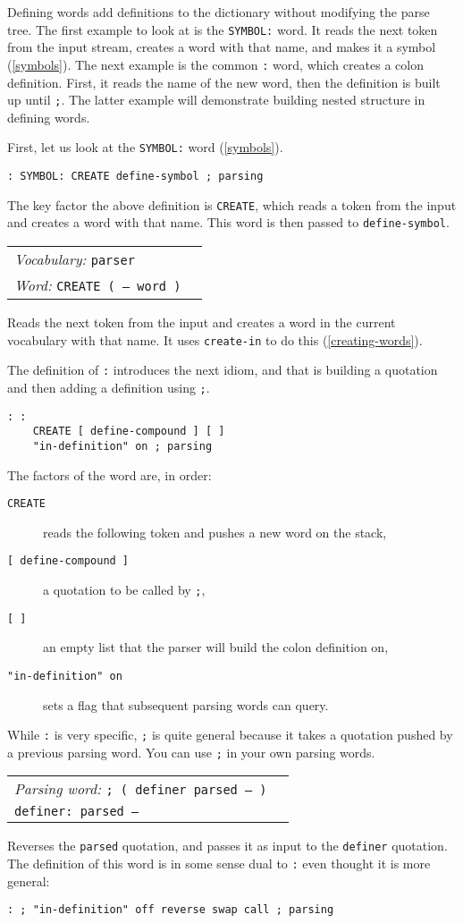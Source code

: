 \documentclass{book}
\newcommand{\vocabulary}[1]{\emph{Vocabulary:} \texttt{#1}&\\}
\newcommand{\parsingword}[2]{\index{\texttt{#1}}\emph{Parsing word:} \texttt{#2}&\\}
\newcommand{\ordinaryword}[2]{\index{\texttt{#1}}\emph{Word:} \texttt{#2}&\\}
\newcommand{\wordtable}[1]{


\begin{tabularx}{12cm}{lX}
\hline
#1
\hline
\end{tabularx}

}
\begin{document}
Defining words add definitions to the dictionary without modifying the parse tree.
The first example to look at is the \verb|SYMBOL:| word. It reads the next token from the input stream, creates a word with that name, and makes it a symbol (\ref{symbols}). The next
example is the common \verb|:| word, which creates a colon definition. First, it reads the
name of the new word, then the definition is built up until \verb|;|. The latter
example will demonstrate building nested structure in defining words.

First, let us look at the \verb|SYMBOL:| word (\ref{symbols}).
\begin{verbatim}
: SYMBOL: CREATE define-symbol ; parsing
\end{verbatim}
The key factor the above definition is \verb|CREATE|, which reads a token from the input and creates a word with that name. This word is then passed to \verb|define-symbol|.

\wordtable{
\vocabulary{parser}
\ordinaryword{CREATE}{CREATE ( -- word )}
}
Reads the next token from the input and creates a word in the current vocabulary with that name. It uses \verb|create-in| to do this (\ref{creating-words}).

The definition of \verb|:| introduces the next idiom, and that is building a quotation and then adding a definition using \verb|;|.
\begin{verbatim}
: :
    CREATE [ define-compound ] [ ]
    "in-definition" on ; parsing
\end{verbatim}
The factors of the word are, in order:
\begin{description}
\item[\texttt{CREATE}] reads the following token and pushes a new word on the stack,
\item[\texttt{[ define-compound ]}] a quotation to be called by \verb|;|,
\item[\texttt{[ ]}] an empty list that the parser will build the colon definition on,
\item[\texttt{"in-definition" on}] sets a flag that subsequent parsing words can query.
\end{description}
While \verb|:| is very specific, \verb|;| is quite general because it takes a quotation pushed by a previous parsing word. You can use \verb|;| in your own parsing words.

\wordtable{
\parsingword{;}{;~( definer parsed -- )}
\texttt{definer:~parsed --}\\
}
Reverses the \verb|parsed| quotation, and passes it as input to the \verb|definer| quotation.
The definition of this word is in some sense dual to \verb|:| even thought it is more general:
\begin{verbatim}
: ; "in-definition" off reverse swap call ; parsing
\end{verbatim}
\end{document}
